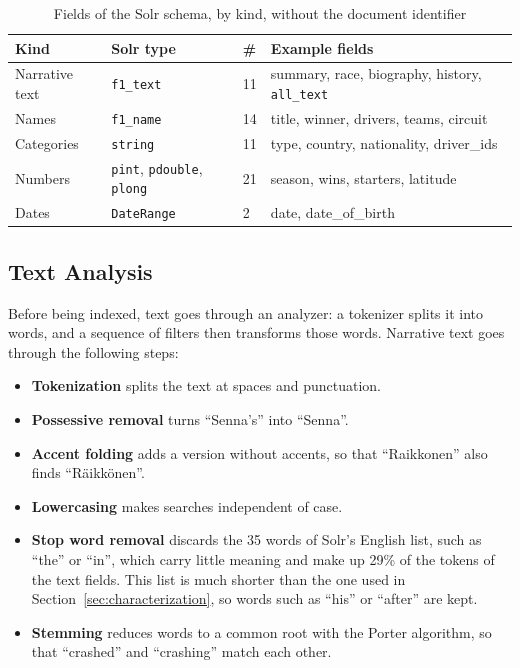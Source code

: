 \documentclass[sigconf]{acmart}
\begin{document}
\begin{table}[ht]
  \small
  \begin{tabular}{p{1.5cm}p{1.9cm}p{0.35cm}p{3.6cm}}
    \toprule
    Kind & Solr type & \# & Example fields \\
    \midrule
    Narrative text & \texttt{f1\_text} & 11 & summary, race, biography,
    history, \texttt{all\_text} \\
    Names & \texttt{f1\_name} & 14 & title, winner, drivers, teams, circuit \\
    Categories & \texttt{string} & 11 & type, country, nationality,
    driver\_ids \\
    Numbers & \texttt{pint}, \texttt{pdouble}, \texttt{plong} & 21 & season,
    wins, starters, latitude \\
    Dates & \texttt{DateRange} & 2 & date, date\_of\_birth \\
    \bottomrule
  \end{tabular}
  \caption{Fields of the Solr schema, by kind, without the document
  identifier}
  \label{tab:schema}
\end{table}

\subsection{Text Analysis}
\label{sec:analysis}
Before being indexed, text goes through an analyzer: a tokenizer splits it
into words, and a sequence of filters then transforms those words. Narrative
text goes through the following steps:

\begin{itemize}
  \item \textbf{Tokenization} splits the text at spaces and punctuation.
  \item \textbf{Possessive removal} turns ``Senna's'' into ``Senna''.
  \item \textbf{Accent folding} adds a version without accents, so that
  ``Raikkonen'' also finds ``Räikkönen''.
  \item \textbf{Lowercasing} makes searches independent of case.
  \item \textbf{Stop word removal} discards the 35 words of Solr's English
  list, such as ``the'' or ``in'', which carry little meaning and make up
  29\% of the tokens of the text fields. This list is much shorter than the
  one used in Section~\ref{sec:characterization}, so words such as ``his'' or
  ``after'' are kept.
  \item \textbf{Stemming} reduces words to a common root with the Porter
  algorithm, so that ``crashed'' and ``crashing'' match each other.
\end{itemize}
\end{document}
